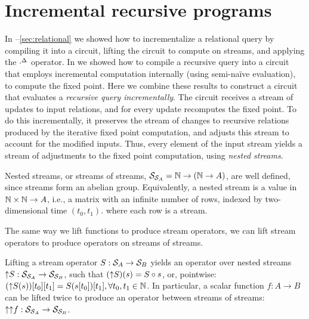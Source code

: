 \section{Incremental recursive programs}\label{sec:nested}

In --\ref{sec:relational}
we showed how to incrementalize a relational query by
compiling it into a circuit, lifting the circuit to compute on streams, and
applying the ${\cdot}^{\Delta}$ operator.  In  we showed
how to compile a recursive query into a circuit that employs incremental
computation internally (using semi-na\"ive evaluation), to compute the fixed point.
Here we combine these results to construct a circuit that evaluates a \emph{recursive
query incrementally}.  The circuit receives a stream of updates to input
relations, and for every update recomputes the fixed point.  To do this
incrementally, it preserves the stream of changes to recursive relations
produced by the iterative fixed point computation, and adjusts this stream to
account for the modified inputs.  Thus, every element of the input stream yields
a stream of adjustments to the fixed point computation, using
\emph{nested streams}.

Nested streams, or streams of streams, $\mathcal{S}_{\mathcal{S}_{A}} = \mathbb{N} \rightarrow (\mathbb{N}
\rightarrow A)$, are well defined, since streams form an abelian group.
Equivalently, a nested stream is a value in $\mathbb{N} \times \mathbb{N} \to A$, i.e., a matrix
with an infinite number of rows, indexed by two-dimensional time $(t_0, t_1)$.
where each row is a stream.

The same way we lift functions to produce stream operators, we can
lift stream operators to produce operators on streams of streams.

Lifting a stream operator $S: \mathcal{S}_{A} \to \mathcal{S}_{B}$ yields an operator over
nested streams ${\uparrow}S: \mathcal{S}_{\mathcal{S}_{A}} \to \mathcal{S}_{\mathcal{S}_{B}}$, such
that $({\uparrow}S)(s) = S \circ s$, or, pointwise: $({\uparrow}S(s))[t_0][t_1] =
S(s[t_0])[t_1], \forall t_0, t_1 \in \mathbb{N}$.  In particular, a scalar function $f:
A \rightarrow B$ can be lifted twice to produce an operator between streams of
streams: ${\uparrow}{\uparrow}f: \mathcal{S}_{\mathcal{S}_{A}} \rightarrow \mathcal{S}_{\mathcal{S}_{B}}$.

\begin{center}
\end{center}

